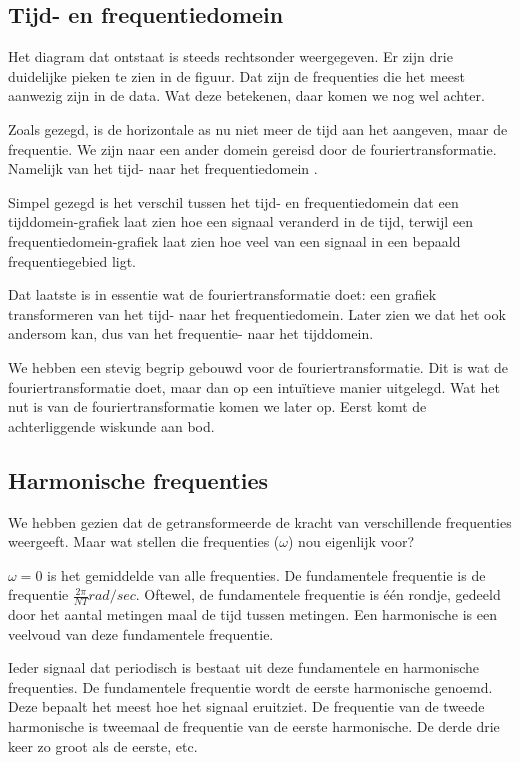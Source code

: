 \documentclass[11pt,fleqn]{book} %
\begin{document}
\subsection{Tijd- en frequentiedomein}
Het diagram dat ontstaat is steeds rechtsonder weergegeven. Er zijn drie duidelijke pieken te zien in de figuur. Dat zijn de frequenties die het meest aanwezig zijn in de data. Wat deze betekenen, daar komen we nog wel achter.

Zoals gezegd, is de horizontale as nu niet meer de tijd aan het aangeven, maar de frequentie. We zijn naar een ander domein gereisd door de fouriertransformatie. Namelijk van het tijd- naar het frequentiedomein \cite{fd}.

Simpel gezegd is het verschil tussen het tijd- en frequentiedomein dat een tijddomein-grafiek laat zien hoe een signaal veranderd in de tijd, terwijl een frequentiedomein-grafiek laat zien hoe veel van een signaal in een bepaald frequentiegebied ligt.

Dat laatste is in essentie wat de fouriertransformatie doet: een grafiek transformeren van het tijd- naar het frequentiedomein. Later zien we dat het ook andersom kan, dus van het frequentie- naar het tijddomein.

We hebben een stevig begrip gebouwd voor de fouriertransformatie. Dit is wat de fouriertransformatie doet, maar dan op een intuïtieve manier uitgelegd. Wat het nut is van de fouriertransformatie komen we later op. Eerst komt de achterliggende wiskunde aan bod.

\subsection{Harmonische frequenties}
We hebben gezien dat de getransformeerde de kracht van verschillende frequenties weergeeft. Maar wat stellen die frequenties ($\omega$) nou eigenlijk voor?

$\omega=0$ is het gemiddelde van alle frequenties. De fundamentele frequentie is de frequentie $\frac{2\pi}{NT} rad/sec$. Oftewel, de fundamentele frequentie is één rondje, gedeeld door het aantal metingen maal de tijd tussen metingen. Een harmonische is een veelvoud van deze fundamentele frequentie.

Ieder signaal dat periodisch is bestaat uit deze fundamentele en harmonische frequenties. De fundamentele frequentie wordt de eerste harmonische genoemd. Deze bepaalt het meest hoe het signaal eruitziet. De frequentie van de tweede harmonische is tweemaal de frequentie van de eerste harmonische. De derde drie keer zo groot als de eerste, etc.
\end{document}
